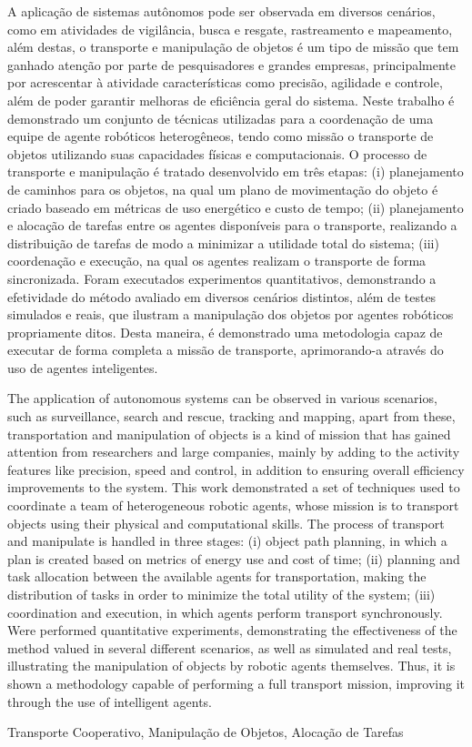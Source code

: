 
A aplicação de sistemas autônomos pode ser observada em diversos cenários, como em atividades de vigilância, busca e resgate, rastreamento e mapeamento, além destas, o transporte e manipulação de objetos é um tipo de missão que tem ganhado atenção por parte de pesquisadores e grandes empresas, principalmente por acrescentar à atividade características como precisão, agilidade e controle, além de poder garantir melhoras de eficiência geral do sistema.
Neste trabalho é demonstrado um conjunto de técnicas utilizadas para a coordenação de uma equipe de agente robóticos heterogêneos, tendo como missão o transporte de objetos utilizando suas capacidades físicas e computacionais.
O processo de transporte e manipulação é tratado desenvolvido em três etapas: (i) planejamento de caminhos para os objetos, na qual um plano de movimentação do objeto é criado baseado em métricas de uso energético e custo de tempo; (ii) planejamento e alocação de tarefas entre os agentes disponíveis para o transporte, realizando a distribuição de tarefas de modo a minimizar a utilidade total do sistema; (iii) coordenação e execução, na qual os agentes realizam o transporte de forma sincronizada.
Foram executados experimentos quantitativos, demonstrando a efetividade do método avaliado em diversos cenários distintos, além de testes simulados e reais, que ilustram a manipulação dos objetos por agentes robóticos propriamente ditos.
Desta maneira, é demonstrado uma metodologia capaz de executar de forma completa a missão de transporte, aprimorando-a através do uso de agentes inteligentes.




%

The application of autonomous systems can be observed in various scenarios, such as surveillance, search and rescue, tracking and mapping, apart from these, transportation and manipulation of objects is a kind of mission that has gained attention from researchers and large companies, mainly by adding to the activity features like precision, speed and control, in addition to ensuring overall efficiency improvements to the system.
This work demonstrated a set of techniques used to coordinate a team of heterogeneous robotic agents, whose mission is to transport objects using their physical and computational skills.
The process of transport and manipulate is handled in three stages: (i) object path planning, in which a plan is created based on metrics of energy use and cost of time; (ii) planning and task allocation between the available agents for transportation, making the distribution of tasks in order to minimize the total utility of the system; (iii) coordination and execution, in which agents perform transport synchronously.
Were performed quantitative experiments, demonstrating the effectiveness of the method valued in several different scenarios, as well as simulated and real tests, illustrating the manipulation of objects by robotic agents themselves.
Thus, it is shown a methodology capable of performing a full transport mission, improving it through the use of intelligent agents.


Transporte Cooperativo, Manipulação de Objetos, Alocação de Tarefas





